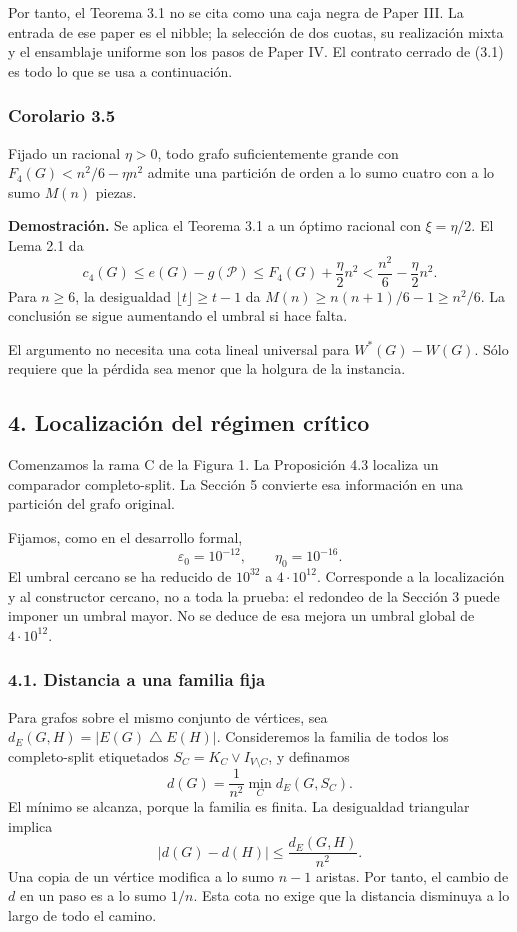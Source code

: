 \documentclass[spanish,11pt,a4paper]{article}
\begin{document}
Por tanto, el Teorema 3.1 no se cita como una caja negra de Paper III. La entrada de ese paper es el nibble; la selección de dos cuotas, su realización mixta y el ensamblaje uniforme son los pasos de Paper IV. El contrato cerrado de (3.1) es todo lo que se usa a continuación.

\subsubsection{Corolario 3.5}\label{corolario-3.5}

Fijado un racional \(\eta>0\), todo grafo suficientemente grande con \(F_4(G)<n^2/6-\eta n^2\) admite una partición de orden a lo sumo cuatro con a lo sumo \(M(n)\) piezas.

\textbf{Demostración.} Se aplica el Teorema 3.1 a un óptimo racional con \(\xi=\eta/2\). El Lema 2.1 da \[
c_4(G)\le e(G)-g(\mathcal P)
\le F_4(G)+\frac\eta2n^2
<\frac{n^2}{6}-\frac\eta2n^2.
\] Para \(n\ge6\), la desigualdad \(\lfloor t\rfloor\ge t-1\) da \(M(n)\ge n(n+1)/6-1\ge n^2/6\). La conclusión se sigue aumentando el umbral si hace falta.

El argumento no necesita una cota lineal universal para \(W^*(G)-W(G)\). Sólo requiere que la pérdida sea menor que la holgura de la instancia.

\subsection{4. Localización del régimen crítico}\label{localizacion-del-regimen-critico}

Comenzamos la rama C de la Figura 1. La Proposición 4.3 localiza un comparador completo-split. La Sección 5 convierte esa información en una partición del grafo original.

Fijamos, como en el desarrollo formal, \[
\varepsilon_0=10^{-12},\qquad \eta_0=10^{-16}.
\tag{4.1}
\] El umbral cercano se ha reducido de \(10^{32}\) a \(4\cdot10^{12}\). Corresponde a la localización y al constructor cercano, no a toda la prueba: el redondeo de la Sección 3 puede imponer un umbral mayor. No se deduce de esa mejora un umbral global de \(4\cdot10^{12}\).

\subsubsection{4.1. Distancia a una familia fija}\label{distancia-a-una-familia-fija}

Para grafos sobre el mismo conjunto de vértices, sea \(d_E(G,H)=|E(G)\mathbin{\triangle}E(H)|\). Consideremos la familia de todos los completo-split etiquetados \(S_C=K_C\vee I_{V\setminus C}\), y definamos \[
d(G)=\frac1{n^2}\min_C d_E(G,S_C).
\] El mínimo se alcanza, porque la familia es finita. La desigualdad triangular implica \[
|d(G)-d(H)|\le\frac{d_E(G,H)}{n^2}.
\tag{4.2}
\] Una copia de un vértice modifica a lo sumo \(n-1\) aristas. Por tanto, el cambio de \(d\) en un paso es a lo sumo \(1/n\). Esta cota no exige que la distancia disminuya a lo largo de todo el camino.
\end{document}
